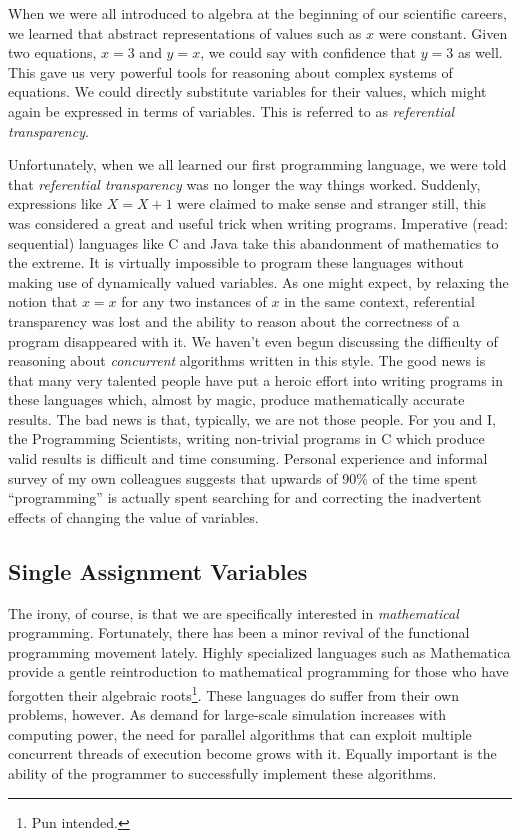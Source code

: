 \documentclass[twocolumn,a4paper,10pt]{article}
\begin{document}
When we were all introduced to algebra at the beginning of our scientific
careers, we learned that abstract representations of values such as $x$ were
constant. Given two equations, $x = 3$ and $y = x$, we could say with confidence
that $y = 3$ as well. This gave us very powerful tools for reasoning about
complex systems of equations. We could directly substitute variables for their
values, which might again be expressed in terms of variables. This is referred
to as \emph{referential transparency}.

Unfortunately, when we all learned our first programming language, we were told
that \emph{referential transparency} was no longer the way things worked.
Suddenly, expressions like $X = X + 1$ were claimed to make sense and stranger
still, this was considered a great and useful trick when writing programs.
Imperative (read: sequential) languages like C and Java take this abandonment of
mathematics to the extreme. It is virtually impossible to program these
languages without making use of dynamically valued variables. As one might
expect, by relaxing the notion that $x = x$ for any two instances of $x$ in the
same context, referential transparency was lost and the ability to reason about
the correctness of a program disappeared with it. We haven't even begun
discussing the difficulty of reasoning about \emph{concurrent} algorithms
written in this style. The good news is that many very talented people have put
a heroic effort into writing programs in these languages which, almost by magic,
produce mathematically accurate results. The bad news is that, typically, we are
not those people. For you and I, the Programming Scientists, writing non-trivial
programs in C which produce valid results is difficult and time consuming.
Personal experience and informal survey of my own colleagues suggests that
upwards of 90\% of the time spent ``programming'' is actually spent searching
for and correcting the inadvertent effects of changing the value of variables.

\subsection{Single Assignment Variables}

The irony, of course, is that we are specifically interested in
\emph{mathematical} programming. Fortunately, there has been a minor revival of
the functional programming movement lately. Highly specialized languages such as
Mathematica provide a gentle reintroduction to mathematical programming for
those who have forgotten their algebraic roots\footnote{Pun intended.}. These
languages do suffer from their own problems, however. As demand for large-scale
simulation increases with computing power, the need for parallel algorithms that
can exploit multiple concurrent threads of execution become grows with it.
Equally important is the ability of the programmer to successfully implement
these algorithms.
\end{document}
